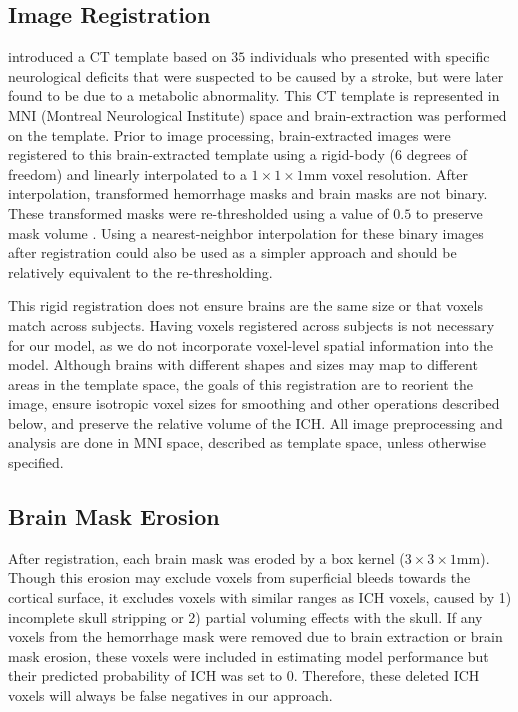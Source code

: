 \documentclass{elsarticle_nonatbib}\usepackage[]{graphicx}\usepackage[]{color}
\begin{document}
\begin{figure}
\label{fig:framework}
\end{figure}

\subsection{Image Registration}
\citet{rorden_age-specific_2012} introduced a CT template based on $35$ individuals who presented with specific neurological deficits that were suspected to be caused by a stroke, but were later found to be due to a metabolic abnormality.  This CT template is represented in MNI (Montreal Neurological Institute) space and brain-extraction was performed on the template.  Prior to image processing, brain-extracted images were registered to this brain-extracted template using a rigid-body (6 degrees of freedom) and linearly interpolated to a $1\times1\times1$mm voxel resolution.  After interpolation, transformed hemorrhage masks and brain masks are not binary.  These transformed masks were re-thresholded using a value of $0.5$ to preserve mask volume \cite{flirt_reg}.  Using a nearest-neighbor interpolation for these binary images after registration could also be used as a simpler approach and should be relatively equivalent to the re-thresholding.

This rigid registration does not ensure brains are the same size or that voxels match across subjects.  Having voxels registered across subjects is not necessary for our model, as we do not incorporate voxel-level spatial information into the model. Although brains with different shapes and sizes may map to different areas in the template space, the goals of this registration are to reorient the image, ensure isotropic voxel sizes for smoothing and other operations described below, and preserve the relative volume of the ICH.  All image preprocessing and analysis are done in MNI space, described as template space, unless otherwise specified.


\subsection{Brain Mask Erosion}
After registration, each brain mask was eroded by a box kernel ($3\times3\times1$mm).  Though this erosion may exclude voxels from superficial bleeds towards the cortical surface, it excludes voxels with similar ranges as ICH voxels, caused by 1) incomplete skull stripping or 2) partial voluming effects with the skull.  If any voxels from the hemorrhage mask were removed due to brain extraction or brain mask erosion, these voxels were included in estimating model performance but their predicted probability of ICH was set to $0$.  Therefore, these deleted ICH voxels will always be false negatives in our approach.
\end{document}
